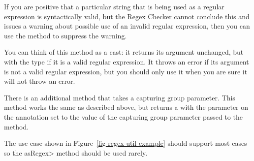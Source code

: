 
If you are positive that a particular string that is being used as a
regular expression is syntactically valid, but the Regex Checker cannot
conclude this and issues a warning about possible use of an invalid regular
expression, then you can use the
 method to suppress the
warning.

You can think of this method
as a cast:  it returns its argument unchanged, but with the type
 if it is a valid regular expression.  It throws an
error if its argument is not a valid regular expression, but you should
only use it when you are sure it will not throw an error.

There is an additional 
method that takes a capturing group parameter. This method works the same as
described above, but returns a  with the parameter on the
annotation set to the value of the capturing group parameter passed to the method.

The use case shown in Figure~\ref{fig-regex-util-example} should support most cases
so the \<asRegex> method should be used rarely.




